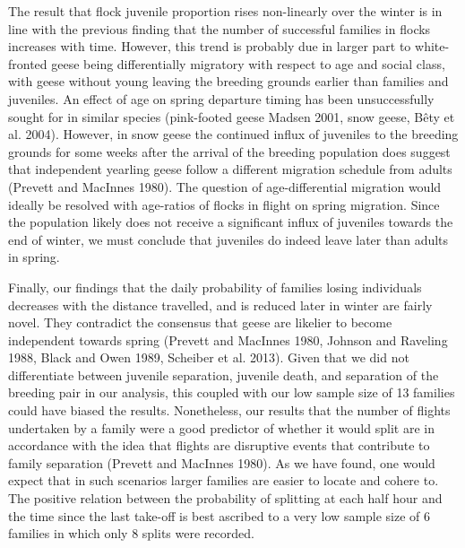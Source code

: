 \documentclass[10pt,twocolumn]{paper}
\begin{document}
The result that flock juvenile proportion rises non-linearly over the
winter is in line with the previous finding that the number of
successful families in flocks increases with time. However, this trend
is probably due in larger part to white-fronted geese being
differentially migratory with respect to age and social class, with
geese without young leaving the breeding grounds earlier than families
and juveniles. An effect of age on spring departure timing has been
unsuccessfully sought for in similar species (pink-footed geese Madsen
2001, snow geese, Bêty et al. 2004). However, in snow geese the
continued influx of juveniles to the breeding grounds for some weeks
after the arrival of the breeding population does suggest that
independent yearling geese follow a different migration schedule from
adults (Prevett and MacInnes 1980). The question of age-differential
migration would ideally be resolved with age-ratios of flocks in flight
on spring migration. Since the population likely does not receive a
significant influx of juveniles towards the end of winter, we must
conclude that juveniles do indeed leave later than adults in spring.

Finally, our findings that the daily probability of families losing
individuals decreases with the distance travelled, and is reduced later
in winter are fairly novel. They contradict the consensus that geese are
likelier to become independent towards spring (Prevett and MacInnes
1980, Johnson and Raveling 1988, Black and Owen 1989, Scheiber et al.
2013). Given that we did not differentiate between juvenile separation,
juvenile death, and separation of the breeding pair in our analysis,
this coupled with our low sample size of 13 families could have biased
the results. Nonetheless, our results that the number of flights
undertaken by a family were a good predictor of whether it would split
are in accordance with the idea that flights are disruptive events that
contribute to family separation (Prevett and MacInnes 1980). As we have
found, one would expect that in such scenarios larger families are
easier to locate and cohere to. The positive relation between the
probability of splitting at each half hour and the time since the last
take-off is best ascribed to a very low sample size of 6 families in
which only 8 splits were recorded.
\end{document}
